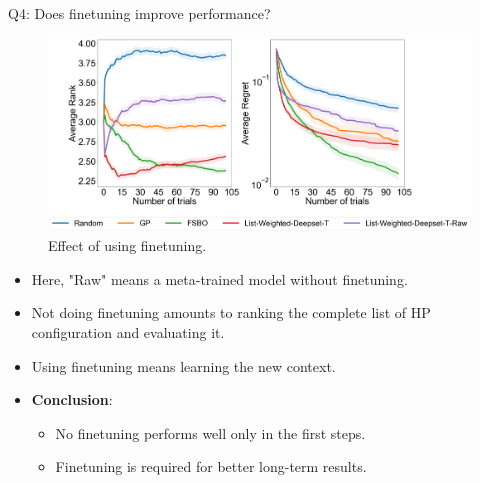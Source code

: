 \documentclass{beamer}
\begin{document}
\begin{frame}[t]{Q4: Does finetuning improve performance?}

\begin{figure}[h]
  \centering
    \includegraphics[scale=0.12]{images/FineTuningAblation}
    \caption{Effect of using finetuning.}
    \label{fig:FineTuningAblation}
\end{figure}

\begin{itemize}
\item Here,  "Raw" means a meta-trained model without finetuning.
\item Not doing finetuning amounts to ranking the complete list of HP configuration and evaluating it.
\item Using finetuning means learning the new context.
\item \textbf{Conclusion}:
\begin{itemize}
\item No finetuning performs well only in the first steps.
\item Finetuning is required for better long-term results.
\end{itemize}
\end{itemize}

\end{frame}
\end{document}
